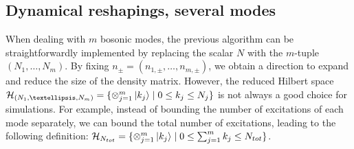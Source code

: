 \documentclass[a4paper,onecolumn,amsmath,amssymb,amsfonts,accepted=2026-03-06]{quantumarticle}
\newcommand{\xH}{\mathcal{H}}
\begin{document}
\subsection{Dynamical reshapings, several modes}
\label{sec:dynamical_severalmodes}
When dealing with $m$ bosonic modes, the previous algorithm can be straightforwardly implemented by replacing the scalar $N$ with the $m$-tuple $(N_1, \ldots, N_m)$. By fixing $n_\pm = (n_{1,\pm}, \ldots, n_{m,\pm})$, we obtain a direction to expand and reduce the size of the density matrix. However, the reduced Hilbert space $\xH_{(N_1, \ldots, N_m)} = \{ \otimes_{j=1}^m \ket{k_j} \mid 0 \leq k_j \leq N_j \}$ is not always a good choice for simulations. For example, instead of bounding the number of excitations of each mode separately, we can bound the total number of excitations, leading to the following definition: $\xH_{N_{\textrm{tot}}} = \{ \otimes_{j=1}^m \ket{k_j} \mid 0 \leq \sum_{j=1}^m k_j \leq N_{\textrm{tot}} \}$.
\end{document}
